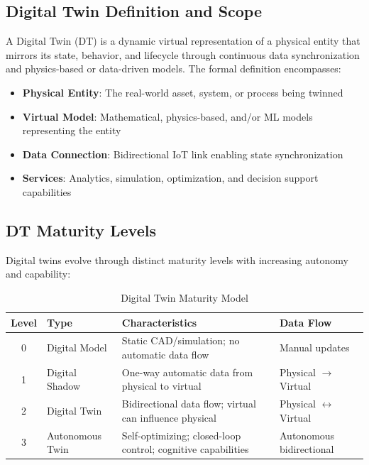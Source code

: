 \documentclass[12pt,a4paper]{article}
\begin{document}
\subsection{Digital Twin Definition and Scope}

A Digital Twin (DT) is a dynamic virtual representation of a physical entity that mirrors its state, behavior, and lifecycle through continuous data synchronization and physics-based or data-driven models. The formal definition encompasses:

\begin{tcolorbox}[colback=twinblue!10, colframe=twinblue, title=Digital Twin Core Components]
\begin{itemize}
    \item \textbf{Physical Entity}: The real-world asset, system, or process being twinned
    \item \textbf{Virtual Model}: Mathematical, physics-based, and/or ML models representing the entity
    \item \textbf{Data Connection}: Bidirectional IoT link enabling state synchronization
    \item \textbf{Services}: Analytics, simulation, optimization, and decision support capabilities
\end{itemize}
\end{tcolorbox}

\subsection{DT Maturity Levels}

Digital twins evolve through distinct maturity levels with increasing autonomy and capability:

\begin{table}[H]
\centering
\caption{Digital Twin Maturity Model}
\begin{tabular}{clp{5cm}p{4cm}}
\toprule
\textbf{Level} & \textbf{Type} & \textbf{Characteristics} & \textbf{Data Flow} \\
\midrule
0 & Digital Model & Static CAD/simulation; no automatic data flow & Manual updates \\
1 & Digital Shadow & One-way automatic data from physical to virtual & Physical $\rightarrow$ Virtual \\
2 & Digital Twin & Bidirectional data flow; virtual can influence physical & Physical $\leftrightarrow$ Virtual \\
3 & Autonomous Twin & Self-optimizing; closed-loop control; cognitive capabilities & Autonomous bidirectional \\
\bottomrule
\end{tabular}
\end{table}
\end{document}
